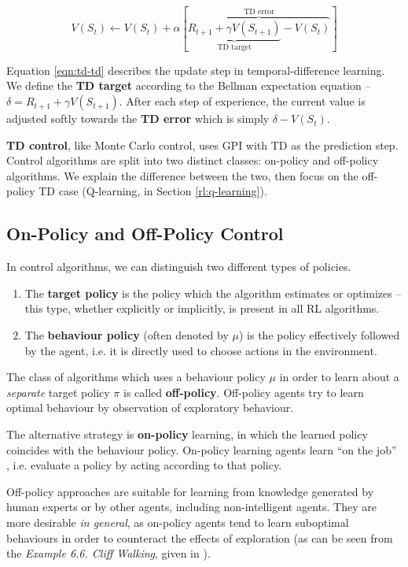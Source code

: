 \begin{equation} \label{eqn:td-td}
    V(S_t) \leftarrow  V(S_t) + \alpha[
        \overbrace{\underbrace{R_{t+1} + \gamma V(S_{t+1})}_\text{TD target} - V(S_t)}^\text{TD error}
    ]
\end{equation}

Equation \ref{eqn:td-td} describes the update step in temporal-difference learning.
We define the \textbf{TD target} according to the Bellman expectation equation -- $\delta = R_{t+1} + \gamma V(S_{t+1})$.
After each step of experience, the current value is adjusted softly towards the \textbf{TD error} which is simply $\delta - V(S_t)$.

\textbf{TD control}, like Monte Carlo control, uses GPI with TD as the prediction step.
Control algorithms are split into two distinct classes: on-policy and off-policy algorithms.
We explain the difference between the two, then focus on the off-policy TD case (Q-learning, in Section \ref{rl:q-learning}).

\subsection{On-Policy and Off-Policy Control}
In control algorithms, we can distinguish two different types of policies.
\begin{enumerate}
    \item The \textbf{target policy} is the policy which the algorithm estimates or optimizes -- this type, whether explicitly or implicitly, is present in all RL algorithms.
    \item The \textbf{behaviour policy} (often denoted by $\mu$) is the policy effectively followed by the agent, i.e. it is directly used to choose actions in the environment.
\end{enumerate}

The class of algorithms which uses a behaviour policy $\mu$ in order to learn about a \emph{separate} target policy $\pi$ is called \textbf{off-policy}.
Off-policy agents try to learn optimal behaviour by observation of exploratory behaviour.

The alternative strategy is \textbf{on-policy} learning, in which the learned policy coincides with the behaviour policy.
On-policy learning agents learn ``on the job'' \cite{silver-lectures}, i.e. evaluate a policy by acting according to that policy.

Off-policy approaches are suitable for learning from knowledge generated by human experts or by other agents, including non-intelligent agents.
They are more desirable \emph{in general}, as on-policy agents tend to learn suboptimal behaviours in order to counteract the effects of exploration (as can be seen from the \emph{Example 6.6. Cliff Walking}, given in \cite{rlai}).

